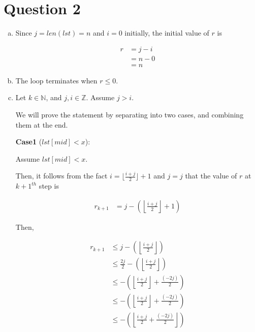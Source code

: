 \documentclass[12pt]{article}
\begin{document}
\section*{Question 2}
\begin{enumerate}[a.]
    \item

    Since $j=len(lst)=n$ and $i=0$ initially, the initial value of $r$ is

    \setcounter{equation}{0}
    \begin{align}
        r &= j - i\\
        &= n - 0\\
        &= n
    \end{align}

    \item

    The loop terminates when $r \leq 0$.

    \item

    Let $k \in \mathbb{N}$, and $j,i \in \mathbb{Z}$. Assume $j > i$.

    \bigskip

    We will prove the statement by separating into two cases, and combining them
    at the end.

    \bigskip

    \textbf{Case1} ($lst[mid] < x$):

    \bigskip

    Assume $lst[mid] < x$.

    \bigskip

    Then, it follows from the fact $i = \lfloor \frac{i+j}{2} \rfloor + 1$ and
    $j = j$ that the value of $r$ at $k+1^{th}$ step is

    \setcounter{equation}{0}
    \begin{align}
        r_{k+1} &= j - \left( \left\lfloor \frac{i + j}{2} \right\rfloor + 1 \right)
    \end{align}

    \bigskip

    Then,

    \begin{align}
        r_{k+1} &\leq j - \left( \left\lfloor \frac{i + j}{2} \right\rfloor \right)\\
        &\leq \frac{2j}{2} - \left( \left\lfloor \frac{i + j}{2} \right\rfloor \right)\\
        &\leq - \left( \left\lfloor \frac{i + j}{2} \right\rfloor + \frac{(-2j)}{2} \right)\\
        &\leq - \left( \left\lfloor \frac{i + j}{2} \right\rfloor + \frac{(-2j)}{2} \right)\\
        &\leq - \left( \left\lfloor \frac{i + j}{2} + \frac{(-2j)}{2} \right\rfloor \right)
    \end{align}


\end{enumerate}
\end{document}
